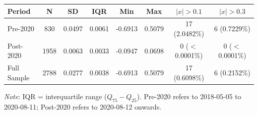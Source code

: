 \begin{tabular}{lccccccc}
  \toprule
  \textbf{Period} & \textbf{N} & \textbf{SD} & \textbf{IQR} & \textbf{Min} & \textbf{Max} & \textbf{$|x|>0.1$} & \textbf{$|x|>0.3$} \\ 
  \midrule
  Pre-2020 & 830 & 0.0497 & 0.0061 & -0.6913 & 0.5079 & 17 (2.0482\%) & 6 (0.7229\%) \\ 
  Post-2020 & 1958 & 0.0063 & 0.0033 & -0.0947 & 0.0698 & 0 ($<$0.0001\%) & 0 ($<$0.0001\%) \\ 
  Full Sample & 2788 & 0.0277 & 0.0038 & -0.6913 & 0.5079 & 17 (0.6098\%) & 6 (0.2152\%) \\ 
  \bottomrule
\end{tabular}
\par\vspace{4pt}
\begin{minipage}{\linewidth}
  \footnotesize \textit{Note}: IQR = interquartile range ($Q_{75}-Q_{25}$). Pre-2020 refers to 2018-05-05 to 2020-08-11; Post-2020 refers to 2020-08-12 onwards.
\end{minipage}